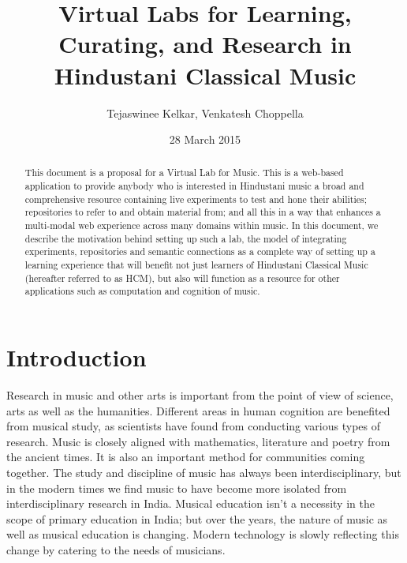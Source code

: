 \documentclass{tufte-handout}
\title{Virtual Labs for Learning, Curating, and Research in Hindustani Classical Music}
\author{Tejaswinee Kelkar,
 Venkatesh Choppella}
\date{28 March 2015}
\begin{document}
\maketitle%

\begin{abstract}
\noindent This document is a proposal for a Virtual Lab for Music. 
This is a web-based application to provide anybody who is interested in Hindustani music a broad and comprehensive resource containing live experiments to test and hone their abilities; repositories to refer to and obtain material from; and all this in a way that enhances a multi-modal web experience across many domains within music.
In this document, we describe the motivation behind setting up such a lab, the model of integrating experiments, repositories and semantic connections as a complete way of setting up a learning experience that will benefit not just learners of Hindustani Classical Music (hereafter referred to as HCM), but also will function as a resource for other applications such as computation and cognition of music.
\end{abstract}


\section{Introduction}\label{sec:introduction}

Research in music and other arts is important from the point of view of science, arts as well as the humanities. Different areas in human cognition are benefited from musical study, as scientists have found from conducting various types of research. Music is closely aligned with mathematics, literature and poetry from the ancient times. It is also an important method for communities coming together. The study and discipline of music has always been interdisciplinary, but in the modern times we find music to have become more isolated from interdisciplinary research in India. Musical education isn't a necessity in the scope of primary education in India; but over the years, the nature of music as well as musical education is changing. Modern technology is slowly reflecting this change by catering to the needs of musicians.
\end{document}

